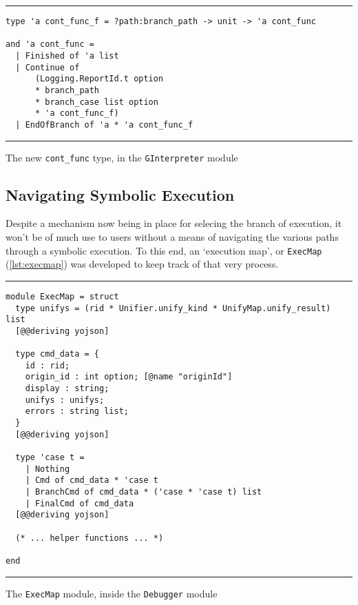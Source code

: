 \begin{listing}[!ht]
\noindent\rule{\textwidth}{0.5pt}
\vspace{-0.6cm}
\begin{verbatim}
type 'a cont_func_f = ?path:branch_path -> unit -> 'a cont_func

and 'a cont_func =
  | Finished of 'a list
  | Continue of
      (Logging.ReportId.t option
      * branch_path
      * branch_case list option
      * 'a cont_func_f)
  | EndOfBranch of 'a * 'a cont_func_f
\end{verbatim}
\vspace{-0.4cm}
\noindent\rule{\textwidth}{0.5pt}
\vspace{-0.6cm}
\caption{The new \texttt{cont\_func} type, in the \texttt{GInterpreter} module}
\label{lst:contfunc-type-new}
\end{listing}


\subsection{Navigating Symbolic Execution}

Despite a mechanism now being in place for selecing the branch of execution, it
won't be of much use to users without a means of navigating the various paths
through a symbolic execution. To this end, an `execution map', or
\texttt{ExecMap} (\autoref{lst:execmap}) was developed to keep track of that
very process.

\begin{listing}[!ht]
\noindent\rule{\textwidth}{0.5pt}
\vspace{-0.6cm}
\begin{verbatim}
module ExecMap = struct
  type unifys = (rid * Unifier.unify_kind * UnifyMap.unify_result) list
  [@@deriving yojson]

  type cmd_data = {
    id : rid;
    origin_id : int option; [@name "originId"]
    display : string;
    unifys : unifys;
    errors : string list;
  }
  [@@deriving yojson]

  type 'case t =
    | Nothing
    | Cmd of cmd_data * 'case t
    | BranchCmd of cmd_data * ('case * 'case t) list
    | FinalCmd of cmd_data
  [@@deriving yojson]

  (* ... helper functions ... *)

end
\end{verbatim}
\vspace{-0.4cm}
\noindent\rule{\textwidth}{0.5pt}
\vspace{-0.6cm}
\caption{The \texttt{ExecMap} module, inside the \texttt{Debugger} module}
\label{lst:execmap}
\end{listing}

